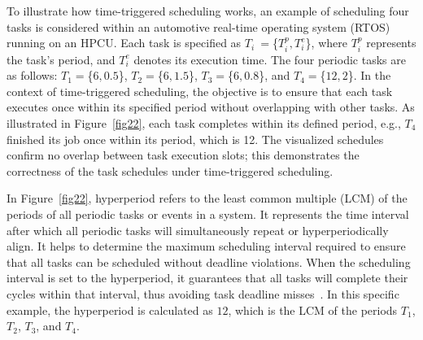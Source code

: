 


    To illustrate how time-triggered scheduling works, an example of scheduling four tasks is considered within an automotive real-time operating system (RTOS) running on an HPCU. Each task is specified as $T_i~= $\{$T_i^p, T_i^e$\}, where $T_i^p$ represents the task's period, and $T_i^e$ denotes its execution time. The four periodic tasks are as follows: $T_1=$\{$6, 0.5$\}, $T_2=$\{$6, 1.5$\}, $T_3=$\{$6, 0.8$\}, and $T_4=$\{$12, 2$\}. 
    In the context of time-triggered scheduling, the objective is to ensure that each task executes once within its specified period without overlapping with other tasks. As illustrated in Figure~\ref{fig22}, each task completes within its defined period, e.g., $T_4$ finished its job once within its period, which is 12. The visualized schedules confirm no overlap between task execution slots; this demonstrates the correctness of the task schedules under time-triggered scheduling.




    In Figure~\ref{fig22}, hyperperiod refers to the least common multiple (LCM) of the periods of all periodic tasks or events in a system. It represents the time interval after which all periodic tasks will simultaneously repeat or hyperperiodically align. It helps to determine the maximum scheduling interval required to ensure that all tasks can be scheduled without deadline violations. When the scheduling interval is set to the hyperperiod, it guarantees that all tasks will complete their cycles within that interval, thus avoiding task deadline misses~\cite{askaripoor2023designer}. In this specific example, the hyperperiod is calculated as $12$, which is the LCM of the periods $T_1$, $T_2$, $T_3$, and $T_4$.  




